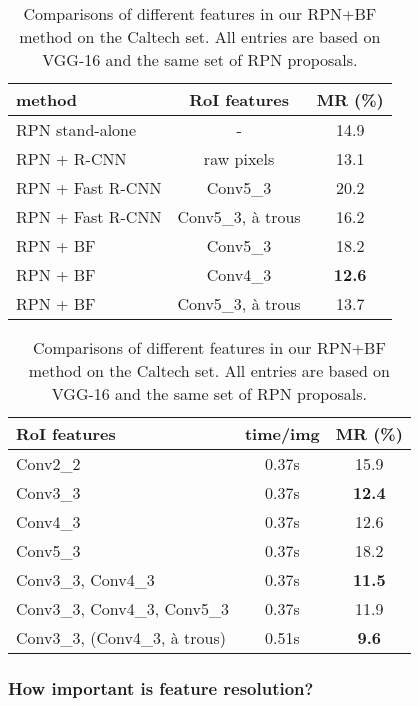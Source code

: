 \documentclass[runningheads]{llncs}
\begin{document}
\renewcommand\arraystretch{1.2}
\setlength{\tabcolsep}{6pt}
\begin{table}[h]
\begin{center}
\begin{tabular}{l|c|c}
\hline
method & RoI features & MR (\%) \\
\hline\hline
RPN stand-alone & - & 14.9 \\
\hline
RPN + R-CNN & raw pixels & 13.1 \\
\hline
RPN + Fast R-CNN & Conv5\_3  & 20.2 \\
RPN + Fast R-CNN & Conv5\_3, \`a trous  & 16.2 \\
\hline
RPN + BF & Conv5\_3  & 18.2  \\
RPN + BF & Conv4\_3  & \textbf{12.6}  \\
RPN + BF & Conv5\_3, \`a trous  & 13.7  \\
\hline
\end{tabular}
\end{center}
\caption{Comparisons of different classifiers and features on the Caltech set. All methods are based on VGG-16 (including R-CNN). The same set of RPN proposals are used for all entries. }
\label{table-classifier}
\begin{center}
\begin{tabular}{l|c|c}
\hline
RoI features & time/img & MR (\%) \\
\hline\hline
Conv2\_2  & 0.37s &15.9  \\
Conv3\_3  & 0.37s & \textbf{12.4}  \\
Conv4\_3  & 0.37s &12.6  \\
Conv5\_3  & 0.37s &18.2  \\
\hline
Conv3\_3, Conv4\_3 & 0.37s & \textbf{11.5}  \\
Conv3\_3, Conv4\_3, Conv5\_3  & 0.37s & 11.9  \\
\hline
Conv3\_3, (Conv4\_3, \`a trous) & 0.51s & \textbf{9.6}  \\
\hline
\end{tabular}
\end{center}
\caption{Comparisons of different features in our RPN+BF method on the Caltech set. All entries are based on VGG-16 and the same set of RPN proposals.}
\label{table-feature}
\end{table}


\subsubsection{How important is feature resolution?}\hfill
\end{document}
